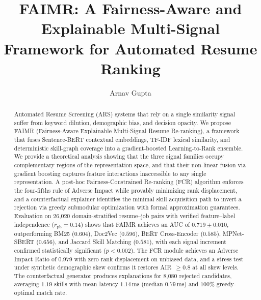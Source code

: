 \documentclass{llncs}
\begin{document}
\title{FAIMR: A Fairness-Aware and Explainable Multi-Signal Framework for Automated Resume Ranking}

\author{Arnav Gupta}


\maketitle

\begin{abstract}
Automated Resume Screening (ARS) systems that rely on a single similarity signal suffer from keyword dilution, demographic bias, and decision opacity. We propose FAIMR (Fairness-Aware Explainable Multi-Signal Resume Re-ranking), a framework that fuses Sentence-BERT contextual embeddings, TF-IDF lexical similarity, and deterministic skill-graph coverage into a gradient-boosted Learning-to-Rank ensemble. We provide a theoretical analysis showing that the three signal families occupy complementary regions of the representation space, and that their non-linear fusion via gradient boosting captures feature interactions inaccessible to any single representation. A post-hoc Fairness-Constrained Re-ranking (FCR) algorithm enforces the four-fifths rule of Adverse Impact while provably minimizing rank displacement, and a counterfactual explainer identifies the minimal skill acquisition path to invert a rejection via greedy submodular optimization with formal approximation guarantees. Evaluation on 26,020 domain-stratified resume--job pairs with verified feature--label independence ($r_{\mathrm{pb}}{=}0.14$) shows that FAIMR achieves an AUC of $0.719 \pm 0.010$, outperforming BM25 ($0.604$), Doc2Vec ($0.596$), BERT Cross-Encoder ($0.585$), MPNet-SBERT ($0.656$), and Jaccard Skill Matching ($0.581$), with each signal increment confirmed statistically significant ($p < 0.002$). The FCR module achieves an Adverse Impact Ratio of $0.979$ with zero rank displacement on unbiased data, and a stress test under synthetic demographic skew confirms it restores AIR~$\geq 0.8$ at all skew levels. The counterfactual generator produces explanations for 8,080 rejected candidates, averaging $1.19$ skills with mean latency $1.14$\,ms (median $0.79$\,ms) and $100\%$ greedy-optimal match rate.
\end{abstract}

\end{document}

